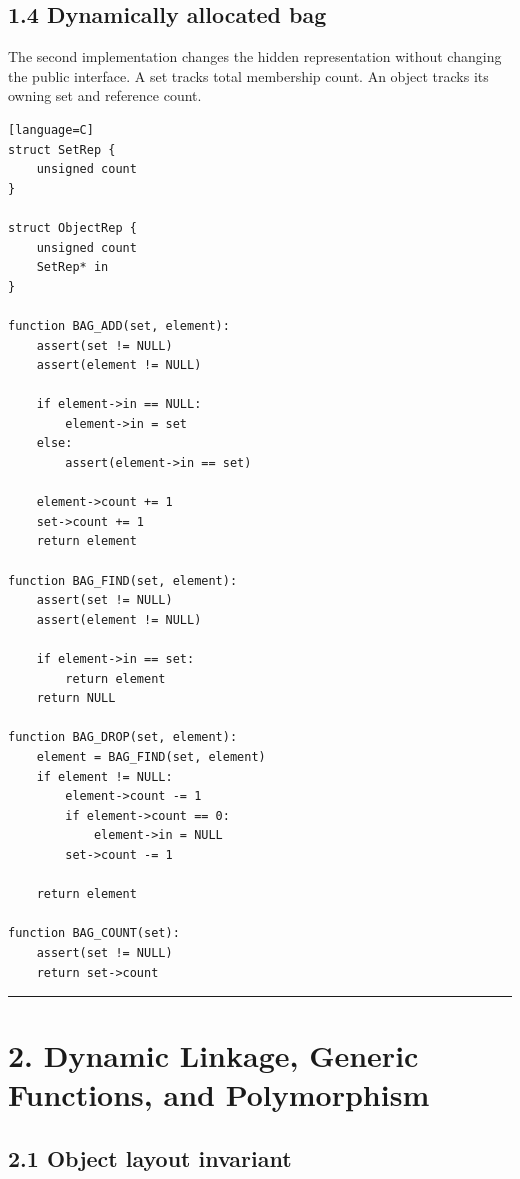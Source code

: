 \documentclass[11pt]{article}
\begin{document}
\subsection{1.4 Dynamically allocated
bag}\label{dynamically-allocated-bag}

The second implementation changes the hidden representation without
changing the public interface. A set tracks total membership count. An
object tracks its owning set and reference count.

\begin{verbatim}[language=C]
struct SetRep {
    unsigned count
}

struct ObjectRep {
    unsigned count
    SetRep* in
}

function BAG_ADD(set, element):
    assert(set != NULL)
    assert(element != NULL)

    if element->in == NULL:
        element->in = set
    else:
        assert(element->in == set)

    element->count += 1
    set->count += 1
    return element

function BAG_FIND(set, element):
    assert(set != NULL)
    assert(element != NULL)

    if element->in == set:
        return element
    return NULL

function BAG_DROP(set, element):
    element = BAG_FIND(set, element)
    if element != NULL:
        element->count -= 1
        if element->count == 0:
            element->in = NULL
        set->count -= 1

    return element

function BAG_COUNT(set):
    assert(set != NULL)
    return set->count
\end{verbatim}

\begin{center}\rule{0.5\linewidth}{0.5pt}\end{center}

\section{2. Dynamic Linkage, Generic Functions, and
Polymorphism}\label{dynamic-linkage-generic-functions-and-polymorphism}

\subsection{2.1 Object layout invariant}\label{object-layout-invariant}
\end{document}
